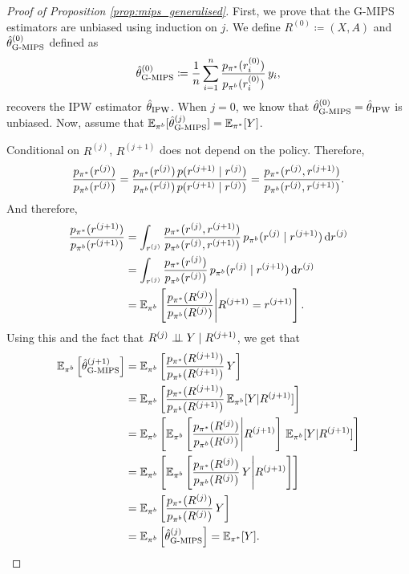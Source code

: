 \begin{proof}[Proof of Proposition \ref{prop:mips_generalised}]
    First, we prove that the G-MIPS estimators are unbiased using induction on $j$. We define $R^{(0)} \coloneqq (X, A)$ and $\hat{\theta}^{(0)}_{\textup{G-MIPS}}$ defined as
    \[
    \hat{\theta}^{(0)}_{\textup{G-MIPS}} \coloneqq \frac{1}{n}\sum_{i=1}^n \frac{p_{\pi^*}(r_i^{(0)})}{p_{\pi^b}(r_i^{(0)})}\, y_i,
    \]
    recovers the IPW estimator $\hat{\theta}_{\textup{IPW}}$. When $j=0$, we know that $\hat{\theta}^{(0)}_{\textup{G-MIPS}} = \hat{\theta}_{\textup{IPW}}$ is unbiased. 
    Now, assume that $\mathbb{E}_{\pi^b}[\hat{\theta}^{(j)}_{\textup{G-MIPS}}] = \mathbb{E}_{\pi^*}[Y]$.

    Conditional on $R^{(j)}$, $R^{(j+1)}$ does not depend on the policy. Therefore, 
    \begin{align*}
        \frac{p_{\pi^*}(r^{(j)})}{p_{\pi^b}(r^{(j)})} = \frac{p_{\pi^*}(r^{(j)})\,p(r^{(j+1)}\mid r^{(j)}) }{p_{\pi^b}(r^{(j)})\,p(r^{(j+1)}\mid r^{(j)})} = \frac{p_{\pi^*}(r^{(j)}, r^{(j+1)})}{p_{\pi^b}(r^{(j)}, r^{(j+1)})}.
    \end{align*}
    And therefore,
    \begin{align*}
        \frac{p_{\pi^*}(r^{(j+1)})}{p_{\pi^b}(r^{(j+1)})} &= \int_{r^{(j)}} \frac{p_{\pi^*}(r^{(j)}, r^{(j+1)})}{p_{\pi^b}(r^{(j)}, r^{(j+1)})} \, p_{\pi^b}(r^{(j)} \mid r^{(j+1)}) \,\mathrm{d} r^{(j)}\\ 
        &= \int_{r^{(j)}} \frac{p_{\pi^*}(r^{(j)})}{p_{\pi^b}(r^{(j)})} \,p_{\pi^b}(r^{(j)} \mid r^{(j+1)}) \,\mathrm{d} r^{(j)}\\ 
        &= \mathbb{E}_{\pi^b}\left[\frac{p_{\pi^*}(R^{(j)})}{p_{\pi^b}(R^{(j)})} \Bigg|  R^{(j+1)}=r^{(j+1)}\right].
    \end{align*}
    Using this and the fact that $R^{(j)}\perp \!\!\! \perp Y \mid R^{(j+1)}$, we get that
    \begin{align*}
        \Ebeh\left[\hat{\theta}^{(j+1)}_{\textup{G-MIPS}} \right] &= \Ebeh\left[\frac{\ptar(R^{(j+1)})}{\pbeh(R^{(j+1)})}\, Y \right]\\
        &= \Ebeh\left[\frac{\ptar(R^{(j+1)})}{\pbeh(R^{(j+1)})}\, \Ebeh[Y| R^{(j+1)}] \right]\\
        &= \Ebeh\left[\Ebeh\left[\frac{\ptar(R^{(j)})}{\pbeh(R^{(j)})} \Bigg|  R^{(j+1)}\right]\, \Ebeh[Y| R^{(j+1)}] \right] \\
        &= \Ebeh\left[\Ebeh\left[\frac{\ptar(R^{(j)})}{\pbeh(R^{(j)})} \, Y \Bigg|  R^{(j+1)}\right]\right]\\
        &= \Ebeh\left[ \frac{\ptar(R^{(j)})}{\pbeh(R^{(j)})} \, Y \right]\\
        &= \Ebeh\left[\hat{\theta}^{(j)}_{\textup{G-MIPS}} \right] = \Etar[Y].

\end{align*}
\end{proof}
